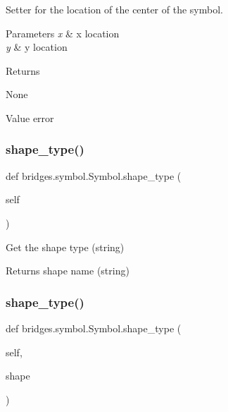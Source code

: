 Setter for the location of the center of the symbol. 


\begin{DoxyParams}{Parameters}
{\em x} & x location \\
\hline
{\em y} & y location \\
\hline
\end{DoxyParams}
\begin{DoxyReturn}{Returns}


None \begin{DoxyVerb}       Value error\end{DoxyVerb}
 
\end{DoxyReturn}
\mbox{\label{classbridges_1_1symbol_1_1_symbol_a86813f0f1a7ecbe5c52725730c887e75}} 
\subsubsection{\texorpdfstring{shape\+\_\+type()}{shape\_type()}\hspace{0.1cm}{\footnotesize\ttfamily [1/2]}}
{\footnotesize\ttfamily def bridges.\+symbol.\+Symbol.\+shape\+\_\+type (\begin{DoxyParamCaption}\item[{}]{self }\end{DoxyParamCaption})}



Get the shape type (string) 

\begin{DoxyReturn}{Returns}
shape name (string) 
\end{DoxyReturn}
\mbox{\label{classbridges_1_1symbol_1_1_symbol_aea966b54a55c137ec15e849829fc9be9}} 
\subsubsection{\texorpdfstring{shape\+\_\+type()}{shape\_type()}\hspace{0.1cm}{\footnotesize\ttfamily [2/2]}}
{\footnotesize\ttfamily def bridges.\+symbol.\+Symbol.\+shape\+\_\+type (\begin{DoxyParamCaption}\item[{}]{self,  }\item[{}]{shape }\end{DoxyParamCaption})}



